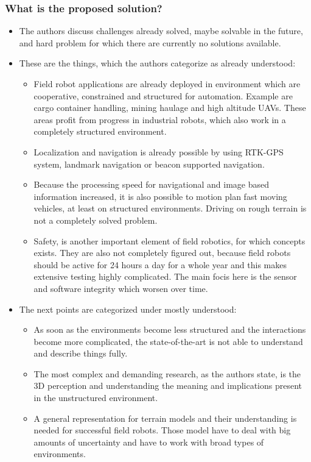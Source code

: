     \subsubsection*{What is the proposed solution?}
    \begin{itemize}
        \item The authors discuss challenges already solved, maybe solvable in the future, and hard problem for which there are currently no solutions available. 
        \item These are the things, which the authors categorize as already understood: \ \begin{itemize}
            \item Field robot applications are already deployed in environment which are cooperative, constrained and structured for automation. Example are cargo container handling, mining haulage and high altitude UAVs. These areas profit from progress in industrial robots, which also work in a completely structured environment.
            \item Localization and navigation is already possible by using RTK-GPS system, landmark navigation or beacon supported navigation.
            \item Because the processing speed for navigational and image based information increased, it is also possible to motion plan fast moving vehicles, at least on structured environments. Driving on rough terrain is not a completely solved problem.
            \item Safety, is another important element of field robotics, for which concepts exists. They are also not completely figured out, because field robots should be active for 24 hours a day for a whole year and this makes extensive testing highly complicated. The main focis here is the sensor and software integrity which worsen over time.
        \end{itemize}
        \item The next points are categorized under mostly understood: \ \begin{itemize}
            \item As soon as the environments become less structured and the interactions become more complicated, the state-of-the-art is not able to understand and describe things fully.
            \item The most complex and demanding research, as the authors state, is the 3D perception and understanding the meaning and implications present in the unstructured environment.
            \item A general representation for terrain models and their understanding is needed for successful field robots. Those model have to deal with big amounts of uncertainty and have to work with broad types of environments.

\end{itemize}
\end{itemize}
